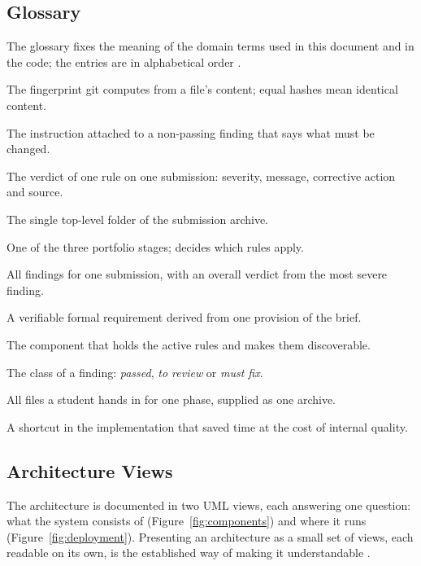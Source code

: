 \documentclass[a4paper,11pt]{article}
\begin{document}
\subsection{Glossary}\label{sec:glossary}

The glossary fixes the meaning of the domain terms used in this document and in
the code; the entries are in alphabetical order \citep{Sommerville2020}.

\begin{description}[leftmargin=3.6cm, style=nextline, font=\normalfont\bfseries, itemsep=0pt]
\item[Blob hash] The fingerprint git computes from a file's content; equal hashes mean identical content.
\item[Corrective action] The instruction attached to a non-passing finding that says what must be changed.
\item[Finding] The verdict of one rule on one submission: severity, message, corrective action and source.
\item[Main directory] The single top-level folder of the submission archive.
\item[Phase] One of the three portfolio stages; decides which rules apply.
\item[Report] All findings for one submission, with an overall verdict from the most severe finding.
\item[Rule] A verifiable formal requirement derived from one provision of the brief.
\item[Rule registry] The component that holds the active rules and makes them discoverable.
\item[Severity] The class of a finding: \textit{passed}, \textit{to review} or \textit{must fix}.
\item[Submission] All files a student hands in for one phase, supplied as one archive.
\item[Technical debt] A shortcut in the implementation that saved time at the cost of internal quality.
\end{description}

\subsection{Architecture Views}\label{sec:architecture}

The architecture is documented in two UML views, each answering one question:
what the system consists of (Figure~\ref{fig:components}) and where it runs
(Figure~\ref{fig:deployment}). Presenting an architecture as a small set of
views, each readable on its own, is the established way of making it
understandable \citep{Bass2021, Brown2024}.
\end{document}
